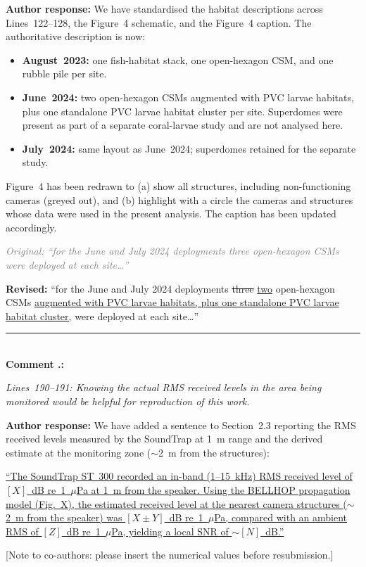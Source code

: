 \documentclass[12pt]{article}
\newcommand{\original}[1]{%
  \textcolor{gray}{\textit{Original: ``#1''}}}
\newcommand{\revised}[1]{%
  \textcolor{addcolor}{\textbf{Revised: }``#1''}}
\newcommand{\added}[1]{\textcolor{addcolor}{\uline{#1}}}
\newcommand{\deleted}[1]{\textcolor{delcolor}{\sout{#1}}}
\newcommand{\authornote}[1]{%
  \par\noindent\textcolor{notecolor}{\textbf{Author response:} #1}\par}
\newenvironment{reviewercomment}{%
  \par\noindent\textcolor{revcolor}\bgroup\itshape}{\egroup\par}
\newcounter{rcounter}[section]
\newcommand{\RC}[1]{%
  \stepcounter{rcounter}%
  \bigskip
  \noindent\rule{\linewidth}{0.4pt}\\[2pt]
  \textbf{Comment \arabic{section}.\arabic{rcounter}:}\\[4pt]
  \begin{reviewercomment}#1\end{reviewercomment}}
\newcommand{\AR}[1]{%
  \authornote{#1}}
\begin{document}
\AR{We have standardised the habitat descriptions across Lines~122--128,
the Figure~4 schematic, and the Figure~4 caption. The authoritative
description is now:

\begin{itemize}[noitemsep]
  \item \textbf{August~2023:} one fish-habitat stack, one open-hexagon CSM,
    and one rubble pile per site.
  \item \textbf{June~2024:} two open-hexagon CSMs augmented with PVC larvae
    habitats, plus one standalone PVC larvae habitat cluster per site.
    Superdomes were present as part of a separate coral-larvae study and are
    not analysed here.
  \item \textbf{July~2024:} same layout as June~2024; superdomes retained for
    the separate study.
\end{itemize}

Figure~4 has been redrawn to (a) show all structures, including
non-functioning cameras (greyed out), and (b) highlight with a circle the
cameras and structures whose data were used in the present analysis. The
caption has been updated accordingly.

\original{for the June and July 2024 deployments three open-hexagon CSMs
were deployed at each site\ldots}

\revised{for the June and July 2024 deployments \deleted{three}
\added{two} open-hexagon CSMs \added{augmented with PVC larvae habitats, plus
one standalone PVC larvae habitat cluster,} were deployed at each site\ldots}}

\RC{Lines~190--191: Knowing the actual RMS received levels in the area being
monitored would be helpful for reproduction of this work.}

\AR{We have added a sentence to Section~2.3 reporting the RMS received levels
measured by the SoundTrap at 1~m range and the derived estimate at the
monitoring zone ($\sim$2~m from the structures):

\added{``The SoundTrap ST~300 recorded an in-band (1--15~kHz) RMS received
level of $[X]$~dB re~1~$\mu$Pa at 1~m from the speaker. Using the BELLHOP
propagation model (Fig.~X), the estimated received level at the nearest camera
structures ($\sim$2~m from the speaker) was $[X\pm Y]$~dB re~1~$\mu$Pa,
compared with an ambient RMS of $[Z]$~dB re~1~$\mu$Pa, yielding a local
SNR of $\sim[N]$~dB.''}

[Note to co-authors: please insert the numerical values before resubmission.]}
\end{document}
